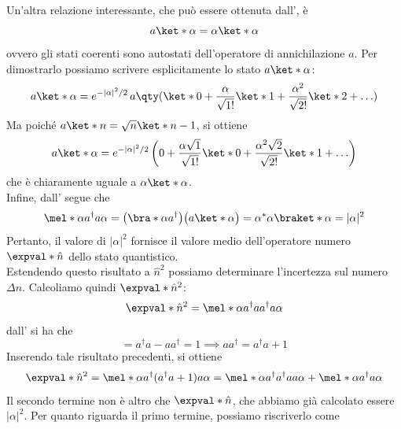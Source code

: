 Un'altra relazione interessante, che può essere ottenuta dall', è
\begin{equation}
   a \ket*{\alpha} = \alpha \ket*{\alpha}
   \label{eq:coherent_state_eigenvalue_equation}
\end{equation}
ovvero gli stati coerenti sono autostati dell'operatore di annichilazione $a$. Per dimostrarlo possiamo scrivere esplicitamente lo stato $a\ket*{\alpha}$:
\begin{equation*}
   a\ket*{\alpha}
   = e^{-|\alpha|^2/2} \, a
   \qty( \ket*{0} + \frac{\alpha}{\sqrt{1!}} \ket*{1} + \frac{\alpha^2}{\sqrt{2!}} \ket*{2} + \ldots )
\end{equation*}
Ma poiché $a\ket*{n} = \sqrt{n}\ket*{n-1}$, si ottiene
\begin{equation*}
   a\ket*{\alpha} = e^{-|\alpha|^2/2} \left( 0 + \frac{\alpha \sqrt{1}}{\sqrt{1!}} \ket*{0} + \frac{\alpha^2 \sqrt{2}}{\sqrt{2!}} \ket*{1} + \ldots \right)
\end{equation*}
che è chiaramente uguale a $\alpha \ket*{\alpha}$.\\
Infine, dall' segue che
\begin{equation*}
   \mel*{\alpha}{a^{\dag} a}{\alpha}
   =\bigl( \bra*{\alpha} a^{\dag} \bigr) \bigl( a \ket*{\alpha} \bigr)
   =\alpha^* \alpha \braket*{\alpha}
   = |\alpha|^2
\end{equation*}
Pertanto, il valore di $|\alpha|^2$ fornisce il valore medio dell'operatore numero $\expval*{\hat{n}}$ dello stato quantistico.\\
Estendendo questo risultato a $\hat{n}^2$ possiamo determinare l'incertezza sul numero $\Delta n$. Calcoliamo quindi $\expval*{\hat{n}^2}$:
\begin{equation*}
   \expval*{\hat{n}^2} = \mel*{\alpha}{a^{\dag} a a^{\dag} a}{\alpha}
\end{equation*}
dall' si ha che
\begin{equation*}
   [a^{\dag}, a] = a^{\dag} a - a a^{\dag} = 1
   \implies
   a a^{\dag} = a^{\dag} a + 1
\end{equation*}
Inserendo tale risultato precedenti, si ottiene
\begin{equation*}
   \expval*{\hat{n}^2}
   =\mel*{\alpha}{a^{\dag}(a^{\dag} a + 1) a }{\alpha}
   =\mel*{\alpha}{a^{\dag}a^{\dag} a a }{\alpha}
   + \mel*{\alpha}{a^{\dag} a}{\alpha}
\end{equation*}
Il secondo termine non è altro che $\expval*{\hat{n}}$, che abbiamo già calcolato essere $|\alpha|^2$. Per quanto riguarda il primo termine, possiamo riscriverlo come
